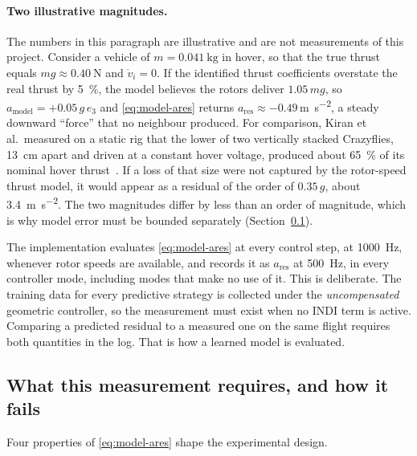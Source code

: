 \paragraph{Two illustrative magnitudes.} The numbers in this paragraph are illustrative and are
not measurements of this project. Consider a vehicle of $m = \SI{0.041}{\kilo\gram}$ in hover, so
that the true thrust equals $mg \approx \SI{0.40}{\newton}$ and $\dot v_i = 0$. If the identified
thrust coefficients overstate the real thrust by \SI{5}{\percent}, the model believes the rotors
deliver $1.05\,mg$, so $a_{\mathrm{model}} = +0.05\,g\,e_3$ and \eqref{eq:model-ares} returns
$a_{\mathrm{res}} \approx -0.49$\,\si{\metre\per\second\squared}, a steady downward ``force'' that
no neighbour produced. For comparison, Kiran et al.\ measured on a static rig that the lower of two
vertically stacked Crazyflies, \SI{13}{\centi\metre} apart and driven at a constant hover voltage,
produced about \SI{65}{\percent} of its nominal hover thrust~\cite{kiran2025downwash}. If a loss of
that size were not captured by the rotor-speed thrust model, it would appear as a residual of the
order of $0.35\,g$, about \SI{3.4}{\metre\per\second\squared}. The two magnitudes differ by less
than an order of magnitude, which is why model error must be bounded separately
(Section~\ref{sec:model-measure-fail}).

The implementation evaluates \eqref{eq:model-ares} at every control step, at \SI{1000}{\hertz},
whenever rotor speeds are available, and records it as $a_{\mathrm{res}}$ at \SI{500}{\hertz}, in
every controller mode, including modes that make no use of it. This is
deliberate. The training data for every predictive strategy is collected under the \emph{uncompensated}
geometric controller, so the measurement must exist when no INDI term is active. Comparing a
predicted residual to a measured one on the same flight requires both quantities in the log.
That is how a learned model is evaluated.

\subsection{What this measurement requires, and how it fails}
\label{sec:model-measure-fail}

Four properties of \eqref{eq:model-ares} shape the experimental design.

